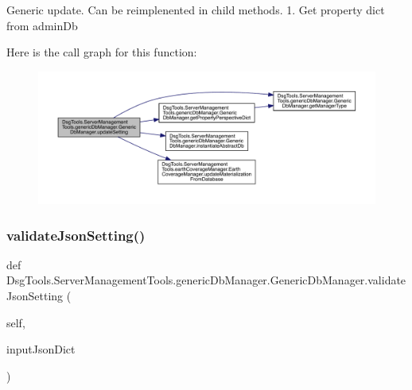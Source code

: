 \begin{DoxyVerb}Generic update. Can be reimplenented in child methods.
1. Get property dict from adminDb 
\end{DoxyVerb}
 Here is the call graph for this function\+:
\nopagebreak
\begin{figure}[H]
\begin{center}
\leavevmode
\includegraphics[width=350pt]{class_dsg_tools_1_1_server_management_tools_1_1generic_db_manager_1_1_generic_db_manager_a4dcc5a53639b84fdc7f847c2a9e65a77_cgraph}
\end{center}
\end{figure}
\mbox{\label{class_dsg_tools_1_1_server_management_tools_1_1generic_db_manager_1_1_generic_db_manager_ae93ce4976f6b22c9f1b4f5ee7d073514}} 
\subsubsection{\texorpdfstring{validate\+Json\+Setting()}{validateJsonSetting()}}
{\footnotesize\ttfamily def Dsg\+Tools.\+Server\+Management\+Tools.\+generic\+Db\+Manager.\+Generic\+Db\+Manager.\+validate\+Json\+Setting (\begin{DoxyParamCaption}\item[{}]{self,  }\item[{}]{input\+Json\+Dict }\end{DoxyParamCaption})}

